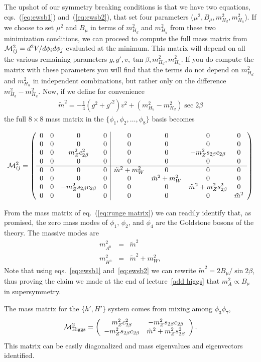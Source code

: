 \documentclass[12pt]{article}
\def\beq{\begin{eqnarray}}
\def\eeq{\end{eqnarray}}
\def\bea{\begin{eqnarray}}
\def\eea{\end{eqnarray}}
\def\eq#1{eq.~(\ref{#1})}
\begin{document}
The upshot of our symmetry breaking conditions is that we have two equations, eqs.~(\ref{eq:ewsb1}) and~(\ref{eq:ewsb2}), that set four parameters ($\mu^2,B_\mu,m_{H_d}^2,m_{H_u}^2$).   If we choose to set $\mu^2$ and $B_\mu$ in terms of $m_{H_d}^2$ and $m_{H_u}^2$ from these two minimization conditions, we can proceed to compute the full mass matrix from ${\cal M}^2_{ij}=d^2V/d\phi_id\phi_j$ evaluated at the minimum. This matrix will depend on all the various remaining parameters $g,g',v,\tan\beta,m_{H_d}^2,m_{H_u}^2$.  If you do compute the matrix with these parameters you will find that the terms do not  depend on $m_{H_d}^2$ and $m_{H_u}^2$ in independent combinations, but rather only on the difference $m_{H_d}^2-m_{H_u}^2$.  Now, if we define for convenience
\beq
\tilde m^2=-\frac{1}{4}(g^2+g'^2)v^2+(m^2_{H_u}-m^2_{H_d})\sec 2\beta
\eeq
the full $8\times 8$ mass matrix in the $\{\phi_1,\phi_2,\ldots,\phi_8\}$ basis becomes
\begin{small}
\beq
{\cal M}^2_{ij}=\left( \begin{array}{cccc|cccc}
0&0&0&0&0&0&0&0 \\
0&0&0&0&0&0&0&0 \\
0&0& m^2_Z c^2_{2\beta} &0&0&0&-m^2_Zs_{2\beta}c_{2\beta}&0 \\
0&0&0&0&0&0&0&0 \\
\hline
0&0&0&0&\tilde m^2+m^2_W&0&0&0 \\
0&0&0&0&0&\tilde m^2+m^2_W&0&0 \\
0&0&-m^2_Zs_{2\beta}c_{2\beta}&0&0&0&\tilde m^2+m^2_Zs^2_{2\beta}&0 \\
0&0&0&0&0&0&0& \tilde m^2
\end{array}\right) \label{eq:runge matrix}
\eeq
\end{small}

From the mass matrix of \eq{eq:runge matrix} we can readily identify that, as promised, the zero mass modes of $\phi_1$, $\phi_2$, and $\phi_4$ are the Goldstone bosons of the theory. The massive modes are
\bea
m^2_{A^0} &= & \tilde m^2 \\
m^2_{H^\pm}&=& \tilde m^2+m_W^2,
\eea
Note that using eqs.~\ref{eq:ewsb1} and~\ref{eq:ewsb2} we can rewrite $\tilde m^2=2B_\mu/\sin 2\beta$, thus proving the claim we made at the end of lecture~\ref{add higgs} that $m_A^2\propto B_\mu$ in supersymmetry.

The mass matrix for the $\{h',H'\}$ system comes from mixing among $\phi_3\phi_7$,
\beq
{\cal M}^2_{\rm Higgs}=\left( \begin{array}{cc}
m^2_Z c^2_{2\beta} & -m_Z^2 s_{2\beta}c_{2\beta} \\
-m_Z^2 s_{2\beta}c_{2\beta} & \tilde m^2+m_Z^2 s^2_{2\beta}
\end{array}\right).
\label{eq:higgs runge matrix}
\eeq
This matrix can be easily diagonalized and mass eigenvalues and  eigenvectors identified.
\end{document}
